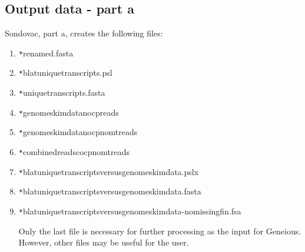 \subsection{Output data - part a}
Sondovac, part a, creates the following files: 

\begin{enumerate}

\item \verb_*_\textunderscore renamed.fasta 



\item \verb_*_\textunderscore blat\textunderscore unique\textunderscore transcripts.psl



\item \verb_*_\textunderscore unique\textunderscore transcripts.fasta



\item \verb_*_\textunderscore genome\textunderscore skim\textunderscore data\textunderscore no\textunderscore cp\textunderscore reads



\item \verb_*_\textunderscore genome\textunderscore skim\textunderscore data\textunderscore no\textunderscore cp\textunderscore no\textunderscore mt\textunderscore reads



\item \verb_*_\textunderscore combined\textunderscore reads\textunderscore co\textunderscore cp\textunderscore no\textunderscore mt\textunderscore reads


\item \verb_*_\textunderscore blat\textunderscore unique\textunderscore transcripts\textunderscore versus\textunderscore genome\textunderscore skim\textunderscore data.pslx


\item \verb_*_\textunderscore blat\textunderscore unique\textunderscore transcripts\textunderscore versus\textunderscore genome\textunderscore skim\textunderscore data.fasta


\item \verb_*_\textunderscore blat\textunderscore unique\textunderscore transcripts\textunderscore versus\textunderscore genome\textunderscore skim\textunderscore data-no\textunderscore missing\textunderscore fin.fsa



Only the last file is necessary for further processing as the input for Geneious. However, other files may be useful for the user. 

\end{enumerate}

